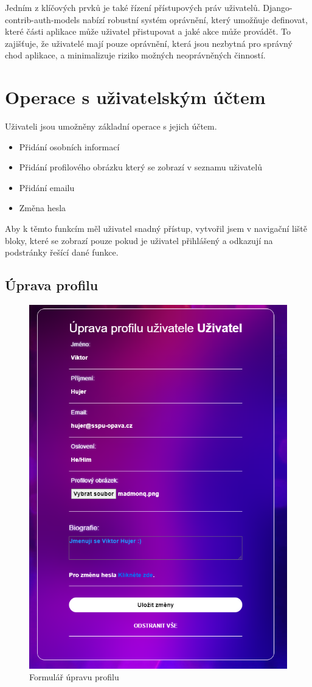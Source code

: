 \documentclass[12pt, a4paper,
twoside,        %
openright
]{report}
\begin{document}
Jedním z klíčových prvků je také řízení přístupových práv uživatelů. Django-contrib-auth-models nabízí robustní systém oprávnění, který umožňuje definovat, které části aplikace může uživatel přistupovat a jaké akce může provádět. To zajišťuje, že uživatelé mají pouze oprávnění, která jsou nezbytná pro správný chod aplikace, a minimalizuje riziko možných neoprávněných činností.
		
		\clearpage	
	\section[Operace s uživatelským účtem]{Operace s uživatelským účtem}
Uživateli jsou umožněny základní operace s jejich účtem.	
\begin{itemize}[label=\(\bullet\)]
  \item Přidání osobních informací
  \item Přidání profilového obrázku který se zobrazí v seznamu uživatelů
  \item Přidání emailu
  \item Změna hesla
\end{itemize}	
Aby k těmto funkcím měl uživatel snadný přístup, vytvořil jsem v navigační liště bloky, které se zobrazí pouze pokud je uživatel přihlášený a odkazují na podstránky řešící dané funkce.
\subsection[Úprava profilu]{Úprava profilu}
\begin{figure}[h]
			\centering
			\includegraphics[width=0.5\linewidth]{image/profile.png} 
			\caption{Formulář úpravu profilu}
		\end{figure}
		
\end{document}
